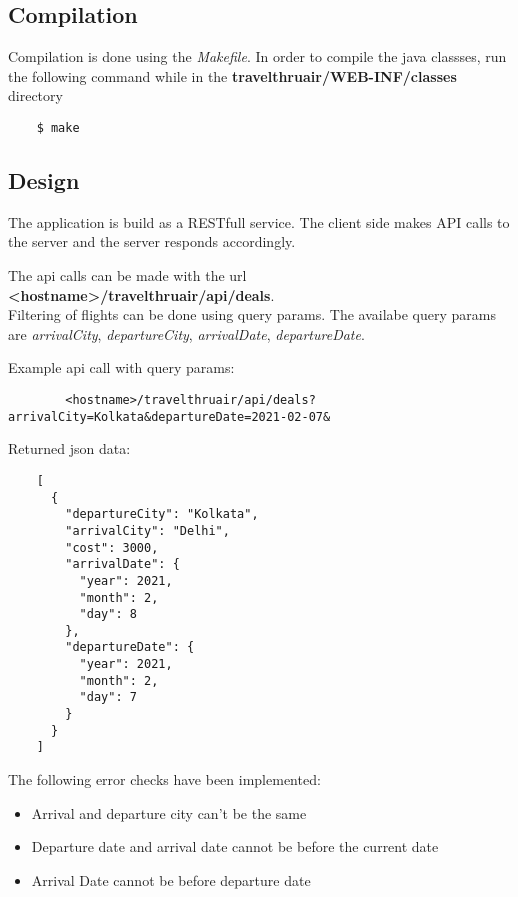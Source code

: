 \documentclass[titlepage]{article}
\begin{document}
    \subsection{Compilation}
    Compilation is done using the \emph{Makefile}.
    In order to compile the java classses, run the following command while in the \textbf{travelthruair/WEB-INF/classes} directory
    \begin{verbatim}
    $ make
    \end{verbatim}
    
    \pagebreak
    \subsection{Design}
    The application is build as a RESTfull service. The client side makes API calls to the server
    and the server responds accordingly.
    

    \noindent
    The api calls can be made with the url \textbf{<hostname>/travelthruair/api/deals}.\\
    Filtering of flights can be done using query params.
    The availabe query params are \emph{arrivalCity}, \emph{departureCity}, \emph{arrivalDate}, \emph{departureDate}.
    
    
    \noindent
    Example api call with query params:
    \begin{verbatim}
        <hostname>/travelthruair/api/deals?arrivalCity=Kolkata&departureDate=2021-02-07&
    \end{verbatim}
    Returned json data:
    \begin{verbatim}
    [
      {
        "departureCity": "Kolkata",
        "arrivalCity": "Delhi",
        "cost": 3000,
        "arrivalDate": {
          "year": 2021,
          "month": 2,
          "day": 8
        },
        "departureDate": {
          "year": 2021,
          "month": 2,
          "day": 7
        }
      }
    ]
    \end{verbatim}

    The following error checks have been implemented:
    \begin{itemize}
        \item Arrival and departure city can’t be the same
        \item Departure date and arrival date cannot be before the current date
        \item Arrival Date cannot be before departure date
    \end{itemize}
\end{document}
